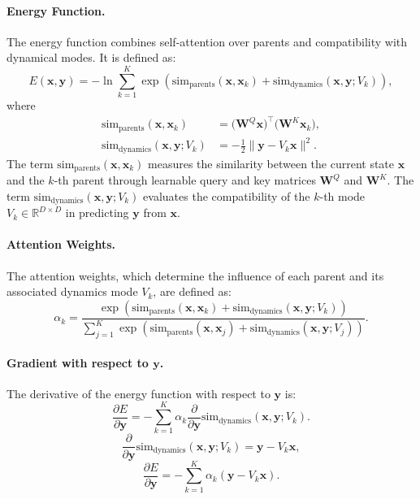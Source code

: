 \documentclass{article}
\begin{document}
\paragraph{Energy Function.} 
The energy function combines self-attention over parents and compatibility with dynamical modes. It is defined as:
\begin{equation}
    E(\bm{x}, \bm{y}) = -\ln \sum_{k=1}^K \exp\left( \mathrm{sim}_{\text{parents}}(\bm{x}, \bm{x}_k) + \mathrm{sim}_{\text{dynamics}}(\bm{x}, \bm{y}; V_k) \right),
\end{equation}
where
\begin{align}
    \mathrm{sim}_{\text{parents}}(\bm{x}, \bm{x}_k) &= \big(\bm{W}^Q \bm{x}\big)^\top \big(\bm{W}^K \bm{x}_k\big), \\
    \mathrm{sim}_{\text{dynamics}}(\bm{x}, \bm{y}; V_k) &= -\frac{1}{2} \|\bm{y} - V_k \bm{x}\|^2.
\end{align}
The term \(\mathrm{sim}_{\text{parents}}(\bm{x}, \bm{x}_k)\) measures the similarity between the current state \(\bm{x}\) and the \(k\)-th parent through learnable query and key matrices \(\bm{W}^Q\) and \(\bm{W}^K\). The term \(\mathrm{sim}_{\text{dynamics}}(\bm{x}, \bm{y}; V_k)\) evaluates the compatibility of the \(k\)-th mode \(V_k \in \mathbb{R}^{D \times D}\) in predicting \(\bm{y}\) from \(\bm{x}\).

\paragraph{Attention Weights.}
The attention weights, which determine the influence of each parent and its associated dynamics mode \(V_k\), are defined as:
\begin{equation}
    \alpha_k = \frac{\exp\left( \mathrm{sim}_{\text{parents}}(\bm{x}, \bm{x}_k) + \mathrm{sim}_{\text{dynamics}}(\bm{x}, \bm{y}; V_k) \right)}{\sum_{j=1}^K \exp\left( \mathrm{sim}_{\text{parents}}(\bm{x}, \bm{x}_j) + \mathrm{sim}_{\text{dynamics}}(\bm{x}, \bm{y}; V_j) \right)}.
\end{equation}

\paragraph{Gradient with respect to \(\bm{y}\).} 
The derivative of the energy function with respect to \(\bm{y}\) is:
\begin{equation}
    \frac{\partial E}{\partial \bm{y}} = -\sum_{k=1}^K \alpha_k \frac{\partial}{\partial \bm{y}} \mathrm{sim}_{\text{dynamics}}(\bm{x}, \bm{y}; V_k).
\end{equation}
\begin{equation}
    \frac{\partial}{\partial \bm{y}} \mathrm{sim}_{\text{dynamics}}(\bm{x}, \bm{y}; V_k) = \bm{y} - V_k \bm{x},
\end{equation}
\begin{equation}
    \frac{\partial E}{\partial \bm{y}} = -\sum_{k=1}^K \alpha_k (\bm{y} - V_k \bm{x}).
\end{equation}
\end{document}
